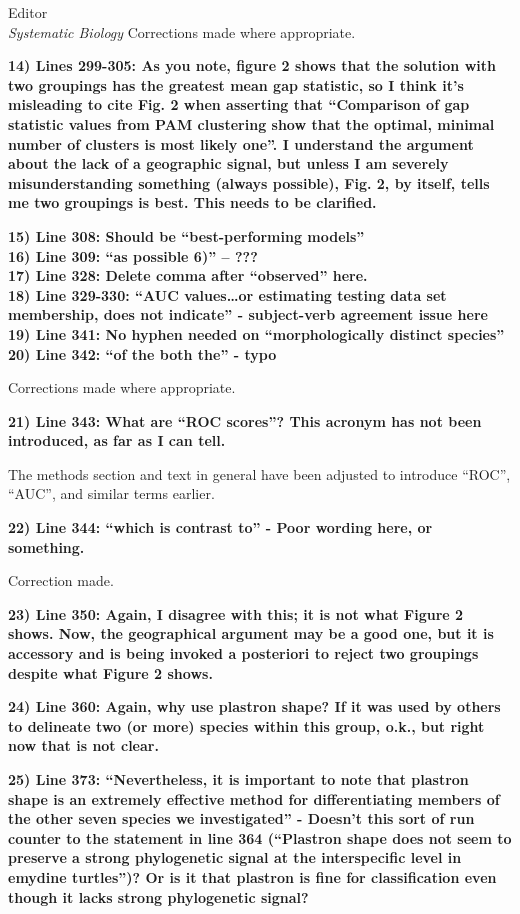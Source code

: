 \documentclass{letter}
\begin{document}
\begin{letter}{Editor \\ \textit{Systematic Biology}}
  Corrections made where appropriate.


  \textbf{14) Lines 299-305: As you note, figure 2 shows that the solution with two groupings has the greatest mean gap statistic, so I think it’s misleading to cite Fig. 2 when asserting that ``Comparison of gap statistic values from PAM clustering show that the optimal, minimal number of clusters is most likely one''. I understand the argument about the lack of a geographic signal, but unless I am severely misunderstanding something (always possible), Fig. 2, by itself, tells me two groupings is best. This needs to be clarified. }


  \textbf{15) Line 308: Should be ``best-performing models''\\
    16) Line 309: ``as possible 6)'' -- ??? \\
    17) Line 328: Delete comma after ``observed'' here. \\
    18) Line 329-330: ``AUC values…or estimating testing data set membership, does not indicate'' - subject-verb agreement issue here \\
    19) Line 341: No hyphen needed on ``morphologically distinct species''\\
  20) Line 342: ``of the both the'' - typo }

  Corrections made where appropriate.


  \textbf{21) Line 343: What are ``ROC scores''? This acronym has not been introduced, as far as I can tell. }

  The methods section and text in general have been adjusted to introduce ``ROC'', ``AUC'', and similar terms earlier.

  \textbf{22) Line 344: ``which is contrast to'' - Poor wording here, or something. }

  Correction made.

  \textbf{23) Line 350: Again, I disagree with this; it is not what Figure 2 shows. Now, the geographical argument may be a good one, but it is accessory and is being invoked a posteriori to reject two groupings despite what Figure 2 shows. }


  \textbf{24) Line 360: Again, why use plastron shape? If it was used by others to delineate two (or more) species within this group, o.k., but right now that is not clear. }


  \textbf{25) Line 373: ``Nevertheless, it is important to note that plastron shape is an extremely effective method for differentiating members of the other seven species we investigated'' - Doesn’t this sort of run counter to the statement in line 364 (``Plastron shape does not seem to preserve a strong phylogenetic signal at the interspecific level in emydine turtles'')? Or is it that plastron is fine for classification even though it lacks strong phylogenetic signal? }


\end{letter}
\end{document}
